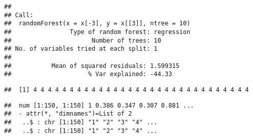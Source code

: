 \documentclass[
]{article}
\begin{document}
\begin{verbatim}
## 
## Call:
##  randomForest(x = x[-3], y = x[[3]], ntree = 10) 
##                Type of random forest: regression
##                      Number of trees: 10
## No. of variables tried at each split: 1
## 
##           Mean of squared residuals: 1.599315
##                     % Var explained: -44.33
\end{verbatim}

\begin{verbatim}
##  [1] 4 4 4 4 4 4 4 4 4 4 4 4 4 4 4 4 4 4 4 4 4 4 4 4 4 4 4 4 4 4
\end{verbatim}

\begin{verbatim}
##  num [1:150, 1:150] 1 0.386 0.347 0.307 0.881 ...
##  - attr(*, "dimnames")=List of 2
##   ..$ : chr [1:150] "1" "2" "3" "4" ...
##   ..$ : chr [1:150] "1" "2" "3" "4" ...
\end{verbatim}
\end{document}
